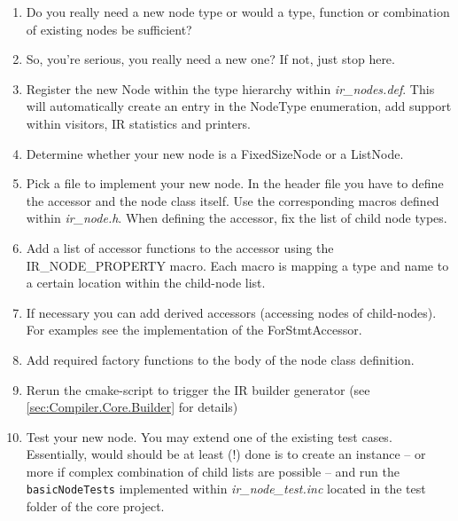 \begin{enumerate}
  \item Do you really need a new node type or would a type, function or
  combination of existing nodes be sufficient?
  
  \item So, you're serious, you really need a new one? If not, just stop here.
  
  \item Register the new Node within the type hierarchy within
  \textit{ir\_nodes.def}. This will automatically create an entry in the
  NodeType enumeration, add support within visitors, IR statistics and printers.
  
  \item Determine whether your new node is a FixedSizeNode or a ListNode.
  
  \item Pick a file to implement your new node. In the header file you have to
  define the accessor and the node class itself. Use the corresponding macros
  defined within \textit{ir\_node.h}. When defining the accessor, fix the list
  of child node types.
  
  \item Add a list of accessor functions to the accessor using the
  IR\_NODE\_PROPERTY macro. Each macro is mapping a type and name to a certain
  location within the child-node list.

  \item If necessary you can add derived accessors (accessing nodes of
  child-nodes). For examples see the implementation of the ForStmtAccessor.
  
  \item Add required factory functions to the body of the node class definition.
  
  \item Rerun the cmake-script to trigger the IR builder generator (see
  \ref{sec:Compiler.Core.Builder} for details)
  
  \item Test your new node. You may extend one of the existing test cases.
  Essentially, would should be at least (!) done is to create an instance -- or
  more if complex combination of child lists are possible -- and run the
  \lstinline|basicNodeTests| implemented within \textit{ir\_node\_test.inc}
  located in the test folder of the core project.
\end{enumerate}
 
 
